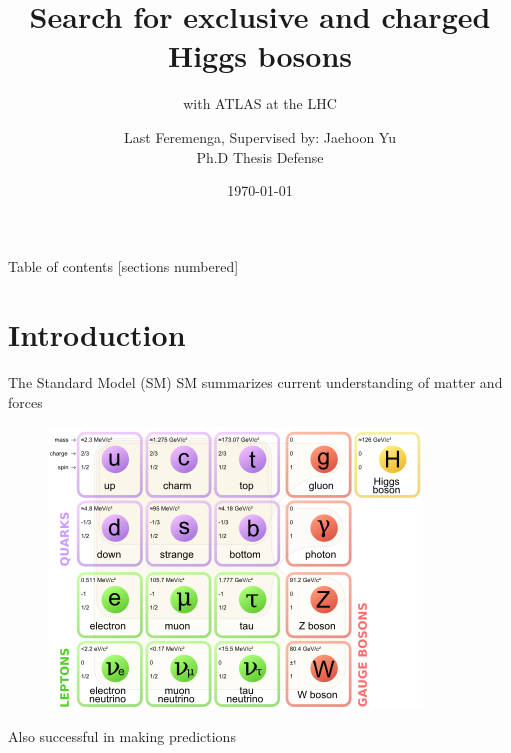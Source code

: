 \documentclass[10pt]{beamer}
\title{Search for exclusive and charged Higgs bosons}
\subtitle{with ATLAS at the LHC}
\date{\today}
\author{Last Feremenga, {\footnotesize Supervised by: Jaehoon Yu}\\ Ph.D Thesis Defense}
\institute{University of Texas at Arlington}
\begin{document}
\maketitle

\begin{frame}{Table of contents}
  [sections numbered]
  \tableofcontents[hideallsubsections]
\end{frame}

\section{Introduction}

\begin{frame}{The Standard Model (SM)}
\centering
 {\color{blue}\large SM summarizes current understanding of matter and forces} 
\begin{figure}
\centering
\includegraphics[width=0.7\linewidth]{figures/sm.png}
\end{figure}
Also successful in making predictions
\end{frame}
\end{document}
